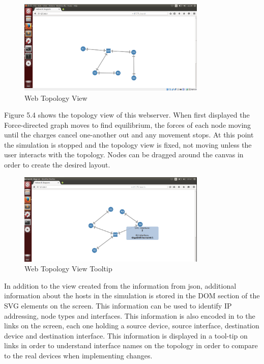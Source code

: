 \documentclass[11pt]{report}
\begin{document}
\begin{figure}[h!]
	\caption{Web Topology View}
	\centering
	\includegraphics[width=0.8\textwidth]{topologyWeb.png}
\end{figure}

Figure 5.4 shows the topology view of this webserver. When first displayed the Force-directed graph moves to find equilibrium, the forces of each node moving until the charges cancel one-another out and any movement stops. At this point the simulation is stopped and the topology view is fixed, not moving unless the user interacts with the topology. Nodes can be dragged around the canvas in order to create the desired layout.

\begin{figure}[!]
	\caption{Web Topology View Tooltip}
	\centering
	\includegraphics[width=0.8\textwidth]{topologyWebHover.png}
\end{figure}

In addition to the view created from the information from json, additional information about the hosts in the simulation is stored in the DOM section of the SVG elements on the screen. This information can be used to identify IP addressing, node types and interfaces. This information is also encoded in to the links on the screen, each one holding a source device, source interface, destination device and destination interface. This information is displayed in a tool-tip on links in order to understand interface names on the topology in order to compare to the real devices when implementing changes.
\end{document}
